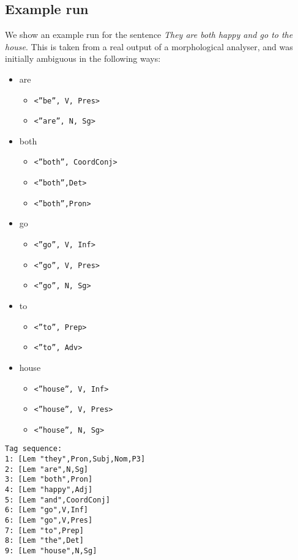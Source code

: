 \documentclass[a4paper, 11pt]{article}
\begin{document}
\subsection{Example run}

We show an example run for the sentence \emph{They are both happy and go to the house}. This is
taken from a real output of a morphological analyser, and was
initially ambiguous in the following ways:

\begin{itemize}
\item[] are
\begin{itemize}
\item[] \texttt{<''be'', V, Pres>}
\item[] \texttt{<''are'', N, Sg>}
\end{itemize}

\item[] both
\begin{itemize}
\item[] \texttt{<''both'', CoordConj>}
\item[] \texttt{<''both'',Det>}
\item[] \texttt{<''both'',Pron>}
\end{itemize}


\item[] go
\begin{itemize}
\item[] \texttt{<''go'', V, Inf>}
\item[] \texttt{<''go'', V, Pres>}
\item[] \texttt{<''go'', N, Sg>}
\end{itemize}

\item[] to
\begin{itemize}
\item[] \texttt{<''to'', Prep>}
\item[] \texttt{<''to'', Adv>}
\end{itemize}

\item[] house
\begin{itemize}
\item[] \texttt{<''house'', V, Inf>}
\item[] \texttt{<''house'', V, Pres>}
\item[] \texttt{<''house'', N, Sg>}
\end{itemize}
\end{itemize}

\begin{verbatim}
Tag sequence:
1: [Lem "they",Pron,Subj,Nom,P3]
2: [Lem "are",N,Sg]
3: [Lem "both",Pron]
4: [Lem "happy",Adj]
5: [Lem "and",CoordConj]
6: [Lem "go",V,Inf]
6: [Lem "go",V,Pres]
7: [Lem "to",Prep]
8: [Lem "the",Det]
9: [Lem "house",N,Sg]
\end{verbatim}


%
%
\end{document}
